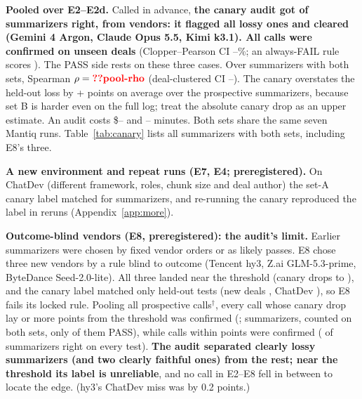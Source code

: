 \documentclass[11pt]{article}
\begin{document}
\textbf{Pooled over E2--E2d.} Called in advance, \textbf{the canary audit got  of  summarizers right, from  vendors: it flagged all  lossy ones and cleared  (Gemini 4 Argon, Claude Opus 5.5, Kimi k3.1). All  calls were confirmed on unseen deals} (Clopper--Pearson CI --\%; an always-FAIL rule scores ). The PASS side rests on these three cases. Over  summarizers with both sets, Spearman $\rho=\N{pool-rho}$ (deal-clustered CI --). The canary overstates the held-out loss by + points on average over the  prospective summarizers, because set B is harder even on the full log; treat the absolute canary drop as an upper estimate. An audit costs \$-- and -- minutes. Both sets share the same seven Mantiq runs. Table~\ref{tab:canary} lists all  summarizers with both sets, including E8's three.

\textbf{A new environment and repeat runs (E7, E4; preregistered).} On ChatDev (different framework, roles, chunk size and deal author) the set-A canary label matched for  summarizers, and re-running the canary reproduced the label in  reruns (Appendix~\ref{app:more}).

\textbf{Outcome-blind vendors (E8, preregistered): the audit's limit.} Earlier summarizers were chosen by fixed vendor orders or as likely passes. E8 chose three new vendors by a rule blind to outcome (Tencent hy3, Z.ai GLM-5.3-prime, ByteDance Seed-2.0-lite). All three landed near the threshold (canary drops  to ), and the canary label matched only  held-out tests (new deals , ChatDev ), so E8 fails its locked rule. Pooling all  prospective calls$^\dagger$, every call whose canary drop lay  or more points from the threshold was confirmed (;  summarizers,  counted on both sets, only  of them PASS), while calls within  points were confirmed  ( of  summarizers right on every test). \textbf{The audit separated clearly lossy summarizers (and two clearly faithful ones) from the rest; near the threshold its label is unreliable}, and no call in E2--E8 fell in between to locate the edge. (hy3's ChatDev miss was by 0.2 points.)
\end{document}
